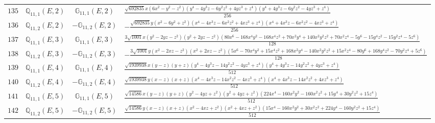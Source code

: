 \documentclass[fleqn,8pt,landscape]{jsarticle}
\begin{document}
\begin{table}[ht!]
\begin{center}
\begin{tabular}{cccl}
$ 135 $ & $ \mathbb{Q}_{11,1}(E,2) $ & $ \mathbb{G}_{11,1}(E,2) $ & $ \frac{\sqrt{692835} x \left(6 x^{2} - y^{2} - z^{2}\right) \left(y^{4} - 4 y^{3} z - 6 y^{2} z^{2} + 4 y z^{3} + z^{4}\right) \left(y^{4} + 4 y^{3} z - 6 y^{2} z^{2} - 4 y z^{3} + z^{4}\right)}{256} $ \\
$ 136 $ & $ \mathbb{Q}_{11,2}(E,2) $ & $ -\mathbb{G}_{11,2}(E,2) $ & $ - \frac{\sqrt{692835} y \left(x^{2} - 6 y^{2} + z^{2}\right) \left(x^{4} - 4 x^{3} z - 6 x^{2} z^{2} + 4 x z^{3} + z^{4}\right) \left(x^{4} + 4 x^{3} z - 6 x^{2} z^{2} - 4 x z^{3} + z^{4}\right)}{256} $ \\
$ 137 $ & $ \mathbb{Q}_{11,1}(E,3) $ & $ \mathbb{G}_{11,1}(E,3) $ & $ \frac{3 \sqrt{1001} x \left(y^{2} - 2 y z - z^{2}\right) \left(y^{2} + 2 y z - z^{2}\right) \left(80 x^{6} - 168 x^{4} y^{2} - 168 x^{4} z^{2} + 70 x^{2} y^{4} + 140 x^{2} y^{2} z^{2} + 70 x^{2} z^{4} - 5 y^{6} - 15 y^{4} z^{2} - 15 y^{2} z^{4} - 5 z^{6}\right)}{128} $ \\
$ 138 $ & $ \mathbb{Q}_{11,2}(E,3) $ & $ -\mathbb{G}_{11,2}(E,3) $ & $ - \frac{3 \sqrt{1001} y \left(x^{2} - 2 x z - z^{2}\right) \left(x^{2} + 2 x z - z^{2}\right) \left(5 x^{6} - 70 x^{4} y^{2} + 15 x^{4} z^{2} + 168 x^{2} y^{4} - 140 x^{2} y^{2} z^{2} + 15 x^{2} z^{4} - 80 y^{6} + 168 y^{4} z^{2} - 70 y^{2} z^{4} + 5 z^{6}\right)}{128} $ \\
$ 139 $ & $ \mathbb{Q}_{11,1}(E,4) $ & $ \mathbb{G}_{11,1}(E,4) $ & $ \frac{\sqrt{1939938} x \left(y - z\right) \left(y + z\right) \left(y^{4} - 4 y^{3} z - 14 y^{2} z^{2} - 4 y z^{3} + z^{4}\right) \left(y^{4} + 4 y^{3} z - 14 y^{2} z^{2} + 4 y z^{3} + z^{4}\right)}{512} $ \\
$ 140 $ & $ \mathbb{Q}_{11,2}(E,4) $ & $ -\mathbb{G}_{11,2}(E,4) $ & $ \frac{\sqrt{1939938} y \left(x - z\right) \left(x + z\right) \left(x^{4} - 4 x^{3} z - 14 x^{2} z^{2} - 4 x z^{3} + z^{4}\right) \left(x^{4} + 4 x^{3} z - 14 x^{2} z^{2} + 4 x z^{3} + z^{4}\right)}{512} $ \\
$ 141 $ & $ \mathbb{Q}_{11,1}(E,5) $ & $ \mathbb{G}_{11,1}(E,5) $ & $ \frac{\sqrt{14586} x \left(y - z\right) \left(y + z\right) \left(y^{2} - 4 y z + z^{2}\right) \left(y^{2} + 4 y z + z^{2}\right) \left(224 x^{4} - 160 x^{2} y^{2} - 160 x^{2} z^{2} + 15 y^{4} + 30 y^{2} z^{2} + 15 z^{4}\right)}{512} $ \\
$ 142 $ & $ \mathbb{Q}_{11,2}(E,5) $ & $ -\mathbb{G}_{11,2}(E,5) $ & $ \frac{\sqrt{14586} y \left(x - z\right) \left(x + z\right) \left(x^{2} - 4 x z + z^{2}\right) \left(x^{2} + 4 x z + z^{2}\right) \left(15 x^{4} - 160 x^{2} y^{2} + 30 x^{2} z^{2} + 224 y^{4} - 160 y^{2} z^{2} + 15 z^{4}\right)}{512} $ \\

\end{tabular}
\end{center}
\end{table}
\end{document}
